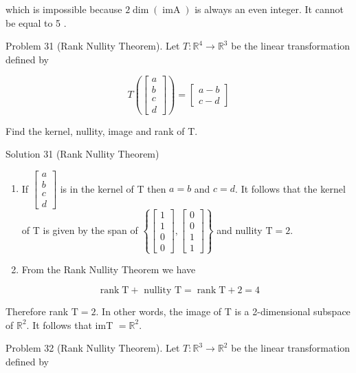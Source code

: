 \documentclass[10pt]{article}
\begin{document}
which is impossible because $2 \operatorname{dim}(\operatorname{imA})$ is always an even integer. It cannot be equal to 5 .

Problem 31 (Rank Nullity Theorem). Let $T: \mathbb{R}^{4} \rightarrow \mathbb{R}^{3}$ be the linear transformation defined by

$$
T\left(\left[\begin{array}{l}
a \\
b \\
c \\
d
\end{array}\right]\right)=\left[\begin{array}{l}
a-b \\
c-d
\end{array}\right]
$$

Find the kernel, nullity, image and rank of T.

Solution 31 (Rank Nullity Theorem)

\begin{enumerate}
  \item If $\left[\begin{array}{l}a \\ b \\ c \\ d\end{array}\right]$ is in the kernel of T then $a=b$ and $c=d$. It follows that the kernel of T is given by the span of $\left\{\left[\begin{array}{l}1 \\ 1 \\ 0 \\ 0\end{array}\right],\left[\begin{array}{l}0 \\ 0 \\ 1 \\ 1\end{array}\right]\right\}$ and nullity $\mathrm{T}=2$.
  \item From the Rank Nullity Theorem we have
\end{enumerate}

$$
\operatorname{rank} \mathrm{T}+\text { nullity } \mathrm{T}=\operatorname{rank} \mathrm{T}+2=4
$$

Therefore rank $\mathrm{T}=2$. In other words, the image of T is a 2-dimensional subspace of $\mathbb{R}^{2}$. It follows that imT $=\mathbb{R}^{2}$.

Problem 32 (Rank Nullity Theorem). Let $T: \mathbb{R}^{3} \rightarrow \mathbb{R}^{2}$ be the linear transformation defined by
\end{document}
